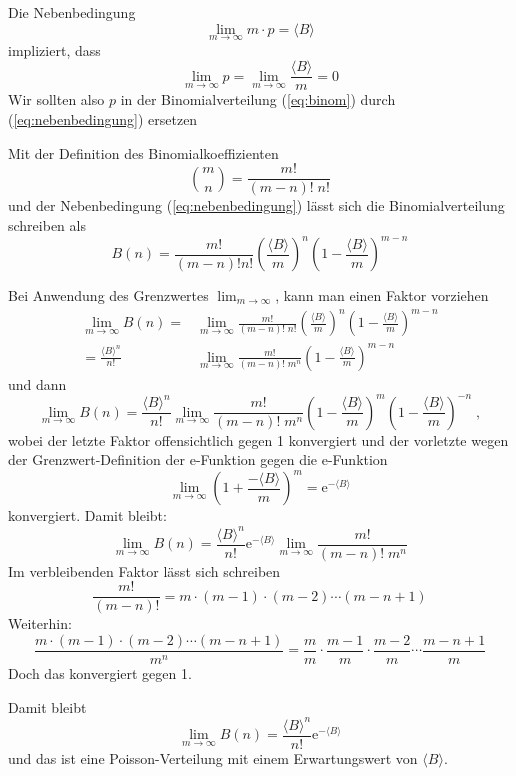 \documentclass[a4paper]{article}
\begin{document}
Die Nebenbedingung
\begin{equation}
    \lim_{m\to\infty} m \cdot p = \langle B \rangle \label{eq:nebenbedingung}
\end{equation}
impliziert, dass
\begin{equation}
    \lim_{m\to\infty} p = \lim_{m\to\infty} \frac{\langle B \rangle}{m} = 0
\end{equation}
Wir sollten also $p$ in der Binomialverteilung (\ref{eq:binom}) durch (\ref{eq:nebenbedingung}) ersetzen

Mit der Definition des Binomialkoeffizienten
\begin{equation}
    \binom{m}{n} = \frac{m!}{(m-n)!\;n!}
\end{equation}
und der Nebenbedingung (\ref{eq:nebenbedingung}) lässt sich
die Binomialverteilung schreiben als
\begin{equation}
    B(n) = \frac{m!}{(m-n)!n!}
       \left( \frac{\langle B \rangle}{m} \right)^n
       \left( 1-\frac{\langle B \rangle}{m} \right)^{m-n}
\end{equation}

Bei Anwendung des Grenzwertes $\lim_{m\to\infty}$, kann man einen Faktor vorziehen
\begin{align*}
    \lim_{m\to\infty} B(n) = &\lim_{m\to\infty} \frac{m!}{(m-n)! \; n!}
       \left( \frac{\langle B \rangle}{m} \right)^n
       \left( 1-\frac{\langle B \rangle}{m} \right)^{m-n} \\
    = \frac{\langle B \rangle^n}{n!} &\lim_{m\to\infty}
        \frac{m!}{(m-n)! \; m^n}
        \left( 1-\frac{\langle B \rangle}{m} \right)^{m-n}
\end{align*}
und dann
\begin{equation}
    \lim_{m\to\infty} B(n) = \frac{\langle B \rangle^n}{n!}
    \lim_{m\to\infty}
        \frac{m!}{(m-n)! \; m^n}
        \left( 1-\frac{\langle B \rangle}{m} \right)^{m}
        \left( 1-\frac{\langle B \rangle}{m} \right)^{-n} \;,
\end{equation}
wobei der letzte Faktor offensichtlich gegen 1 konvergiert
und der vorletzte wegen der Grenzwert-Definition der e-Funktion gegen die e-Funktion
\begin{equation}
    \lim_{m\to\infty} \left( 1 + \frac{-\langle B \rangle}{m} \right)^m = \mathrm{e}^{-\langle B \rangle}
\end{equation}
konvergiert. Damit bleibt:
\begin{equation}
    \lim_{m\to\infty} B(n) = \frac{\langle B \rangle^n}{n!}
    \mathrm{e}^{-\langle B \rangle}
    \lim_{m\to\infty}
        \frac{m!}{(m-n)! \; m^n}
\end{equation}
Im verbleibenden Faktor lässt sich schreiben
\begin{equation}
    \frac{m!}{(m-n)!} = m \cdot (m-1) \cdot (m-2) \cdots (m-n+1)
\end{equation}
Weiterhin:
\begin{equation}
    \frac{ m \cdot (m-1) \cdot (m-2) \cdots (m-n+1) }{m^n}
    = \frac{m}{m} \cdot \frac{m-1}{m} \cdot \frac{m-2}{m} \cdots \frac{m-n+1}{m}
\end{equation}
Doch das konvergiert gegen 1.

Damit bleibt
\begin{equation}
    \lim_{m\to\infty} B(n) = \frac{\langle B \rangle^n}{n!}
    \mathrm{e}^{-\langle B \rangle}
\end{equation}
und das ist eine Poisson-Verteilung
mit einem Erwartungswert von $\langle B \rangle$.
\end{document}
